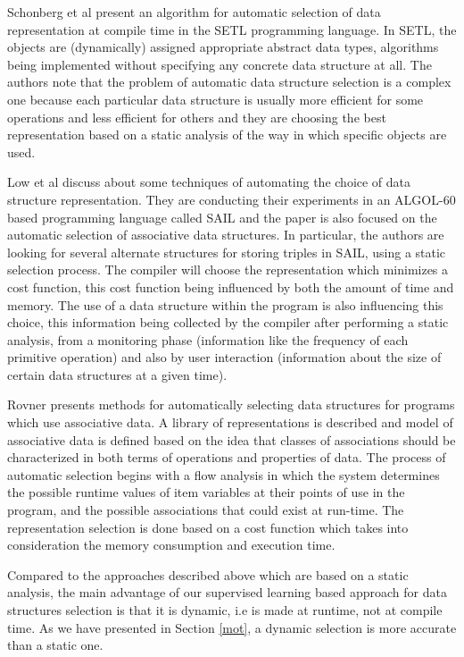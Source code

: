 Schonberg et al  \cite{31} present an algorithm for automatic selection of data representation at compile time in the SETL programming language. In SETL, the objects are (dynamically) assigned appropriate abstract data types, algorithms being implemented without specifying any concrete data structure at all. The authors note that the problem of automatic data structure selection is a complex one because each particular data structure is usually more efficient for some operations and less efficient for others and they are choosing the best representation based on a static analysis of the way in which specific objects are used.

Low et al  \cite{lowrovner} discuss about some techniques of automating the choice of data structure representation. They are conducting their experiments in an ALGOL-60 based programming language called SAIL and the paper is also focused on the automatic selection of associative data structures. In particular, the authors are looking for several alternate structures for storing triples in SAIL, using a static selection process. The compiler will choose the representation which minimizes a cost function, this cost function being influenced by both the amount of time and memory. The use of a data structure within the program is also influencing this choice, this information being collected by the compiler after performing a static analysis, from a monitoring phase (information like the frequency of each primitive operation) and also by user interaction (information about the size of certain data structures at a given time).

Rovner  \cite{rovner} presents methods for automatically selecting data structures for programs which use associative data. A library of representations is described and model of associative data is defined based on the idea that classes of associations should be characterized in both terms of operations and properties of data. The process of automatic selection begins with a flow analysis in which the system determines the possible runtime values of item variables at their points of use in the program, and the possible associations that could exist at run-time. The representation selection is done based on a cost function which takes into consideration the memory consumption and execution time.

Compared to the approaches described above  \cite{29,30,31,Low,lowrovner,rovner}
which are based on a static analysis, the main advantage of our supervised learning based approach for data structures selection is that it is dynamic, i.e is made at runtime, not at compile time. As we have presented in Section \ref{mot}, a dynamic selection is more accurate than a static one.

